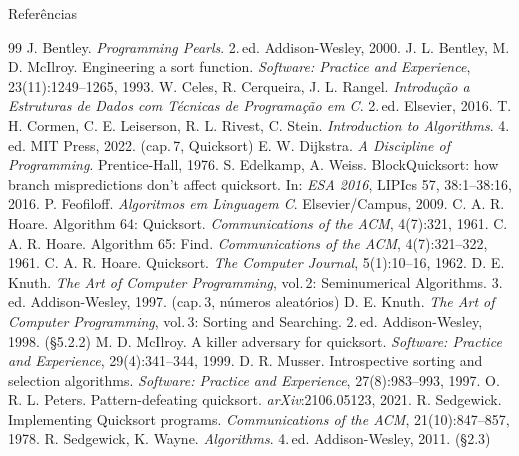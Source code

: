 \documentclass[aspectratio=169,10pt]{beamer}
\newcommand{\setsec}[2]{\colorlet{seccol}{#1}\colorlet{seccolb}{#2}}
\begin{document}
\setsec{mred}{myel}
\begin{frame}[allowframebreaks]{Referências}
 \begin{thebibliography}{99}
   J. Bentley. \emph{Programming Pearls}. 2.\,ed. Addison-Wesley, 2000.
   J. L. Bentley, M. D. McIlroy. Engineering a sort function. \emph{Software: Practice and Experience}, 23(11):1249--1265, 1993.
   W. Celes, R. Cerqueira, J. L. Rangel. \emph{Introdução a Estruturas de Dados com Técnicas de Programação em C}. 2.\,ed. Elsevier, 2016.
   T. H. Cormen, C. E. Leiserson, R. L. Rivest, C. Stein. \emph{Introduction to Algorithms}. 4.\,ed. MIT Press, 2022. (cap.\,7, Quicksort)
   E. W. Dijkstra. \emph{A Discipline of Programming}. Prentice-Hall, 1976.
   S. Edelkamp, A. Weiss. BlockQuicksort: how branch mispredictions don't affect quicksort. In: \emph{ESA 2016}, LIPIcs 57, 38:1--38:16, 2016.
   P. Feofiloff. \emph{Algoritmos em Linguagem C}. Elsevier/Campus, 2009.
   C. A. R. Hoare. Algorithm 64: Quicksort. \emph{Communications of the ACM}, 4(7):321, 1961.
   C. A. R. Hoare. Algorithm 65: Find. \emph{Communications of the ACM}, 4(7):321--322, 1961.
   C. A. R. Hoare. Quicksort. \emph{The Computer Journal}, 5(1):10--16, 1962.
   D. E. Knuth. \emph{The Art of Computer Programming}, vol.\,2: Seminumerical Algorithms. 3.\,ed. Addison-Wesley, 1997. (cap.\,3, números aleatórios)
   D. E. Knuth. \emph{The Art of Computer Programming}, vol.\,3: Sorting and Searching. 2.\,ed. Addison-Wesley, 1998. (\S5.2.2)
   M. D. McIlroy. A killer adversary for quicksort. \emph{Software: Practice and Experience}, 29(4):341--344, 1999.
   D. R. Musser. Introspective sorting and selection algorithms. \emph{Software: Practice and Experience}, 27(8):983--993, 1997.
   O. R. L. Peters. Pattern-defeating quicksort. \emph{arXiv}:2106.05123, 2021.
   R. Sedgewick. Implementing Quicksort programs. \emph{Communications of the ACM}, 21(10):847--857, 1978.
   R. Sedgewick, K. Wayne. \emph{Algorithms}. 4.\,ed. Addison-Wesley, 2011. (\S2.3)

\end{thebibliography}
\end{frame}
\end{document}
